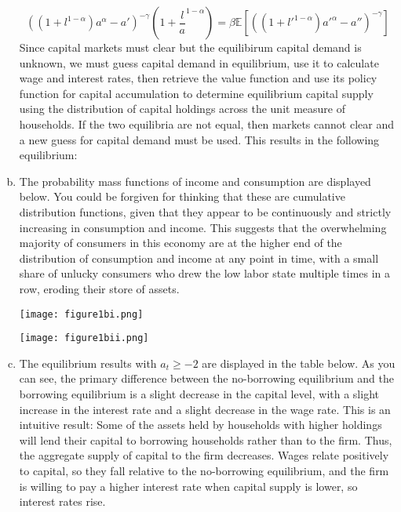 \documentclass{article}
\newcommand{\E}[1]{\mathbb{E}\left[#1\right]} %
\begin{document}
\begin{enumerate}[(a)]
{\[		\]
		}%
		\[
			\left((1+l^{1-\alpha})a^\alpha - a'\right)^{-\gamma}\left(1+\frac{l}{a}^{1-\alpha}\right) = 
			\beta\E{\left((1+l'^{1-\alpha})a'^\alpha - a''\right)^{-\gamma}}
		\]
		Since capital markets must clear but the equilibirum capital demand is unknown, we must guess capital demand in equilibrium, use it to calculate wage and interest rates, then retrieve the value function and use its policy function for capital accumulation to determine equilibrium capital supply using the distribution of capital holdings across the unit measure of households. If the two equilibria are not equal, then markets cannot clear and a new guess for capital demand must be used. This results in the following equilibrium:
			
	
	\item The probability mass functions of income and consumption are displayed below. You could be forgiven for thinking that these are cumulative distribution functions, given that they appear to be continuously and strictly increasing in consumption and income. This suggests that the overwhelming majority of consumers in this economy are at the higher end of the distribution of consumption and income at any point in time, with a small share of unlucky consumers who drew the low labor state multiple times in a row, eroding their store of assets. 
		\begin{center}
			\texttt{[image: figure1bi.png]}
		\end{center}
		\begin{center}
			\texttt{[image: figure1bii.png]}
		\end{center}
	
	
	\item The equilibrium results with ${a_t\geq-2}$ are displayed in the table below. As you can see, the primary difference between the no-borrowing equilibrium and the borrowing equilibrium is a slight decrease in the capital level, with a slight increase in the interest rate and a slight decrease in the wage rate. This is an intuitive result: Some of the assets held by households with higher holdings will lend their capital to borrowing households rather than to the firm. Thus, the aggregate supply of capital to the firm decreases. Wages relate positively to capital, so they fall relative to the no-borrowing equilibrium, and the firm is willing to pay a higher interest rate when capital supply is lower, so interest rates rise.
		
	
	
\end{enumerate}
\end{document}
